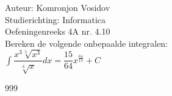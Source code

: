 \documentclass[a4paper]{article}
\newcommand{\dint}{\displaystyle\int}
\begin{document}
	
	\noindent \large Auteur: Komronjon Vosidov \\
	\noindent \large Studierichting: Informatica\\
	\noindent \large Oefeningenreeks 4A nr. 4.10\\
	
	
	\medskip
	\normalsize
	Bereken de volgende onbepaalde integralen:\\
	
$ \dint \dfrac{x^3 \sqrt[5]{x^3}}{\sqrt[3]{x}}  dx = \dfrac{15}{64} x^{\tfrac{64}{15}} + C $
	
	
	
	
	
	
	
	\begin{thebibliography}{999}
	\end{thebibliography}		
\end{document}
